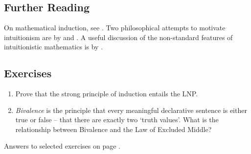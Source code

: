 {\small
\subsection*{Further Reading}

On mathematical induction, see  \citet{macsetthl}. Two philosophical attempts to motivate intuitionism are by \citet{heyintin} and \citet{dumphibai}. A useful discussion of the non-standard features of intuitionistic mathematics is by \citet{int}. 



\subsection*{Exercises} \label{ex1}

\begin{enumerate}
\item Prove that the strong principle of induction entails the LNP.

\item \emph{Bivalence} is the principle that every meaningful declarative sentence is either true or false – that there are exactly two `truth values'. What is the relationship between Bivalence and the Law of Excluded Middle? 


\end{enumerate}

Answers to selected exercises on page \pageref{ans1}.
}







